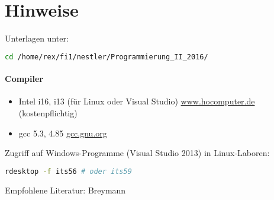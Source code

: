\newcommand{\customDir}{../}












\maketitle
\newpage
\tableofcontents
\newpage

\section*{Hinweise}
Unterlagen unter:
\begin{lstlisting}[language=bash]
cd /home/rex/fi1/nestler/Programmierung_II_2016/
\end{lstlisting}
\paragraph{Compiler} 
\begin{itemize}
\item Intel i16, i13 (für Linux oder Visual Studio) \url{www.hocomputer.de} (kostenpflichtig)
\item gcc 5.3, 4.85 \url{gcc.gnu.org}
\end{itemize}
Zugriff auf Windows-Programme (Visual Studio 2013) in Linux-Laboren:
\begin{lstlisting}[language=bash]
rdesktop -f its56 # oder its59
\end{lstlisting}
Empfohlene Literatur: Breymann\cite{breymann2009c++}

